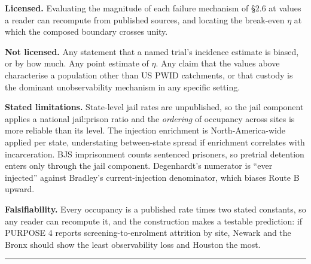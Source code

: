 \textbf{Licensed.} Evaluating the magnitude of each failure mechanism of §2.6 at values a reader can recompute from published sources, and locating the break-even \(\eta\) at which the composed boundary crosses unity.

\textbf{Not licensed.} Any statement that a named trial's incidence estimate is biased, or by how much. Any point estimate of \(\eta\). Any claim that the values above characterise a population other than US PWID catchments, or that custody is the dominant unobservability mechanism in any specific setting.

\textbf{Stated limitations.} State-level jail rates are unpublished, so the jail component applies a national jail:prison ratio and the \emph{ordering} of occupancy across sites is more reliable than its level. The injection enrichment is North-America-wide applied per state, understating between-state spread if enrichment correlates with incarceration. BJS imprisonment counts sentenced prisoners, so pretrial detention enters only through the jail component. Degenhardt's numerator is ``ever injected'' against Bradley's current-injection denominator, which biases Route B upward.

\textbf{Falsifiability.} Every occupancy is a published rate times two stated constants, so any reader can recompute it, and the construction makes a testable prediction: if PURPOSE 4 reports screening-to-enrolment attrition by site, Newark and the Bronx should show the least observability loss and Houston the most.

\begin{center}\rule{0.5\linewidth}{0.5pt}\end{center}
